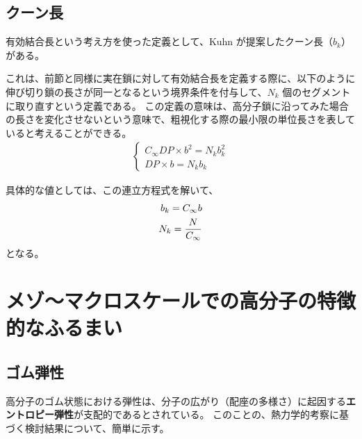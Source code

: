 \documentclass[uplatex,dvipdfmx,a4paper,11pt, titlepage]{jsarticle}
\begin{document}
\subsection{クーン長}

有効結合長という考え方を使った定義として、Kuhn が提案したクーン長（$b_k$）がある。

これは、前節と同様に実在鎖に対して有効結合長を定義する際に、以下のように伸び切り鎖の長さが同一となるという境界条件を付与して、$N_k$ 個のセグメントに取り直すという定義である。
この定義の意味は、高分子鎖に沿ってみた場合の長さを変化させないという意味で、粗視化する際の最小限の単位長さを表していると考えることができる。
\begin{align}
 \begin{cases}
	C_{\infty} DP \times b^2 = N_k b_k^2 \\
	DP \times b = N_k b_k
 \end{cases}
\end{align}

具体的な値としては、この連立方程式を解いて、
\begin{align}
b_k = C_{\infty} b \notag \\
N_k = \dfrac{N}{C_{\infty} }
\end{align}
となる。

\newpage


\section{メゾ～マクロスケールでの高分子の特徴的なふるまい}

%
%
%
%

\subsection{ゴム弾性}

高分子のゴム状態における弾性は、分子の広がり（配座の多様さ）に起因する{\bf エントロピー弾性}が支配的であるとされている。
このことの、熱力学的考察に基づく検討結果について、簡単に示す。
\end{document}
